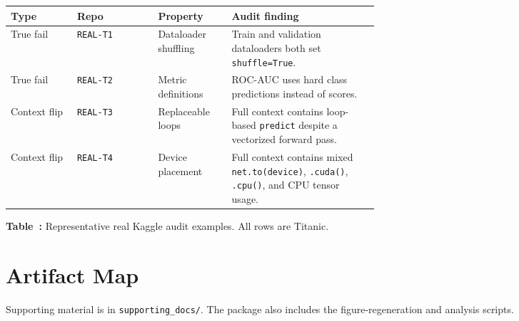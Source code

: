 \documentclass[11pt]{article}
\begin{document}
\label{tab:real-audit-examples}
\begin{center}
  \centering
  \scriptsize
  \setlength{\tabcolsep}{2.5pt}
  \begin{tabularx}{\linewidth}{@{}>{\raggedright\arraybackslash}p{0.18\linewidth}>{\raggedright\arraybackslash}p{0.22\linewidth}>{\raggedright\arraybackslash}p{0.20\linewidth}X@{}}
    \toprule
    Type & Repo & Property & Audit finding \\
    \midrule
    True fail & \texttt{REAL-T1} & Dataloader shuffling &
    Train and validation dataloaders both set \texttt{shuffle=True}. \\
    True fail & \texttt{REAL-T2} & Metric definitions &
    ROC-AUC uses hard class predictions instead of scores. \\
    Context flip & \texttt{REAL-T3} & Replaceable loops &
    Full context contains loop-based \texttt{predict} despite a vectorized
    forward pass. \\
    Context flip & \texttt{REAL-T4} & Device placement &
    Full context contains mixed \texttt{net.to(device)}, \texttt{.cuda()},
    \texttt{.cpu()}, and CPU tensor usage. \\
    \bottomrule
  \end{tabularx}
  \smallskip
  {\footnotesize \textbf{Table~\thetable:} Representative real Kaggle audit
  examples. All rows are Titanic.}
\end{center}

\section{Artifact Map}

Supporting material is in \texttt{supporting\_docs/}. The package also includes
the figure-regeneration and analysis scripts.
\end{document}
